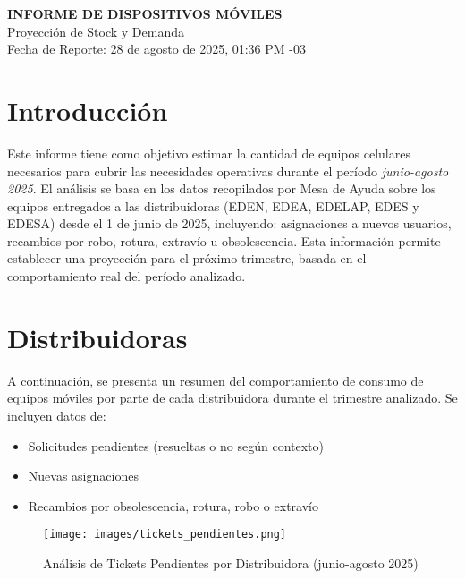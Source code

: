 \documentclass[a4paper,12pt]{article}
\begin{document}
\begin{center}
    {\Large \textbf{INFORME DE DISPOSITIVOS MÓVILES}} \\
    \vspace{0.2cm}
    Proyección de Stock y Demanda \\
    \vspace{0.2cm}
    Fecha de Reporte: 28 de agosto de 2025, 01:36 PM -03
\end{center}

\section*{Introducción}
Este informe tiene como objetivo estimar la cantidad de equipos celulares necesarios para cubrir las necesidades operativas durante el período \textit{junio-agosto 2025}. El análisis se basa en los datos recopilados por Mesa de Ayuda sobre los equipos entregados a las distribuidoras (EDEN, EDEA, EDELAP, EDES y EDESA) desde el 1 de junio de 2025, incluyendo: asignaciones a nuevos usuarios, recambios por robo, rotura, extravío u obsolescencia. Esta información permite establecer una proyección para el próximo trimestre, basada en el comportamiento real del período analizado.

\section{Distribuidoras}
A continuación, se presenta un resumen del comportamiento de consumo de equipos móviles por parte de cada distribuidora durante el trimestre analizado. Se incluyen datos de:
\begin{itemize}
    \item Solicitudes pendientes (resueltas o no según contexto)
    \item Nuevas asignaciones
    \item Recambios por obsolescencia, rotura, robo o extravío
\end{itemize}

\begin{figure}[h]
    \centering
    \texttt{[image: images/tickets\_pendientes.png]}
    \caption{Análisis de Tickets Pendientes por Distribuidora (junio-agosto 2025)}
\end{figure}
\end{document}
